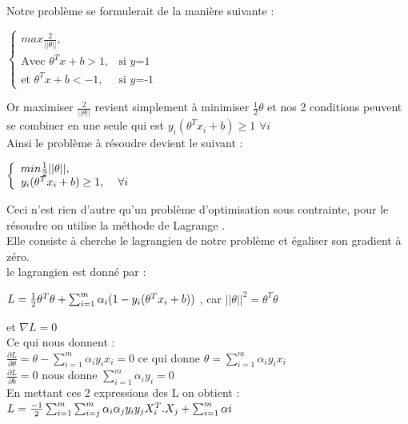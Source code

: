 Notre problème se formulerait de la manière suivante :
\begin{center}
	$ \left\{\begin{array}{ll}
	max  \frac{2}{||\theta||} ,&  \\
     \mbox{Avec } {\theta }^{T}{x} + b > 1	, & \mbox{si } y\mbox{=1} \\
          \mbox{et  } {\theta }^{T}{x} + b < -1	, & \mbox{si } y\mbox{=-1} 
	\end{array}\right.$
\end{center}
Or maximiser $\frac{2}{||\theta||}$ revient simplement à minimiser $ \frac{1}{2}\theta$
et nos 2 conditions peuvent se combiner en une seule qui est ${y}_{i}({\theta }^{T}{x}_{i} + b )\geq 1 $  $\forall i $ \\
Ainsi le problème à résoudre devient le suivant :
\begin{center}
	$ \left\{\begin{array}{ll}
	min  \frac{1}{2} {||\theta||} ,&  \\
	{y}_{i}({\theta }^{T}{x}_{i} + b )\geq 1, &  \mbox{ $ \forall i$ } \\
	\end{array}\right.$
\end{center}
Ceci n'est rien d'autre qu'un problème d'optimisation sous contrainte, pour le résoudre on utilise la méthode de Lagrange .\\
Elle consiste à cherche le lagrangien de notre problème et égaliser son gradient à zéro.\\
le lagrangien est donné par : 
\begin{center}
 $ {\Large L} = \frac{1}{2} {\theta}^{T} \theta + \sum _{i=1}^{m}{\alpha}_{i}(1-{y}_{i}({\theta }^{T}{x}_{i} + b ))$
 , car  $|| {\theta}||^{2} = {\theta}^{T} \theta $ 
\end{center} 
et ${\nabla }{L}=0$ \\
Ce qui nous donnent : \\
$\frac{\partial L}{\partial {\theta}} =  \theta -  \sum _{i=1}^{m}{\alpha}_{i}{y}_{i}{x}_{i} =0$   ce qui donne  $\theta =  \sum _{i=1}^{m}{\alpha}_{i}{y}_{i}{x}_{i}$\\
$\frac{\partial L}{\partial {b }} =0 $ nous donne $\sum _{i=1}^{m}{\alpha}_{i}{y}_{i}=0 $ \\
En mettant ces 2 expressions des L on obtient : \\
${\Large L} =\frac{-1}{2} \sum _{i=1}^{m} \sum _{i=j}^{m} {\alpha}_{i}{\alpha}_{j}{y}_{i}{y}_{j} {X}_{i}^{T} . {{X}_{j}}+ \sum _{i=1}^{m} {\alpha}{i} $ \\
